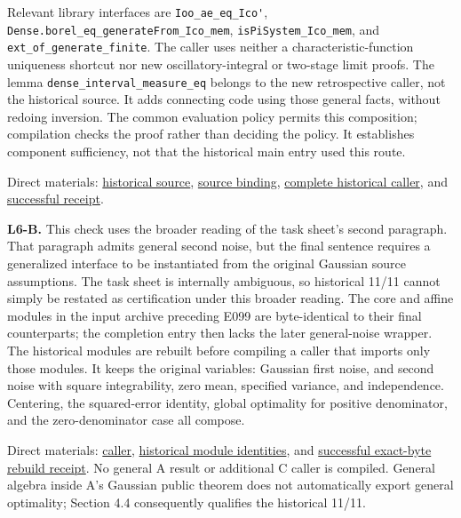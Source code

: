 Relevant library interfaces are \nolinkurl{Ioo_ae_eq_Ico'}, \nolinkurl{Dense.borel_eq_generateFrom_Ico_mem}, \nolinkurl{isPiSystem_Ico_mem}, and \nolinkurl{ext_of_generate_finite}. The caller uses neither a characteristic-function uniqueness shortcut nor new oscillatory-integral or two-stage limit proofs. The lemma \nolinkurl{dense_interval_measure_eq} belongs to the new retrospective caller, not the historical source. It adds connecting code using those general facts, without redoing inversion. The common evaluation policy permits this composition; compilation checks the proof rather than deciding the policy. It establishes component sufficiency, not that the historical main entry used this route.

Direct materials: \href{research/analysis_20260915/final_research_supplement_20260915/evidence/H1_before_E468.lean}{historical source}, \href{research/analysis_20260915/final_research_supplement_20260915/checks/H1_source_binding.json}{source binding}, \href{research/analysis_20260915/final_research_supplement_20260915/checks/H1_historical_caller.lean}{complete historical caller}, and \href{research/analysis_20260915/final_research_supplement_20260915/checks/h1_historical_caller.json}{successful receipt}.

\textbf{L6-B.} This check uses the broader reading of the task sheet's second paragraph. That paragraph admits general second noise, but the final sentence requires a generalized interface to be instantiated from the original Gaussian source assumptions. The task sheet is internally ambiguous, so historical 11/11 cannot simply be restated as certification under this broader reading. The core and affine modules in the input archive preceding E099 are byte-identical to their final counterparts; the completion entry then lacks the later general-noise wrapper. The historical modules are rebuilt before compiling a caller that imports only those modules. It keeps the original variables: Gaussian first noise, and second noise with square integrability, zero mean, specified variance, and independence. Centering, the squared-error identity, global optimality for positive denominator, and the zero-denominator case all compose.

Direct materials: \href{research/analysis_20260915/final_research_supplement_20260915/checks/L6_B_composition.lean}{caller}, \href{research/analysis_20260915/final_research_supplement_20260915/checks/L6_source_binding.json}{historical module identities}, and \href{research/analysis_20260915/final_research_supplement_20260915/checks/l6_historical_rebuild_exact_bytes.json}{successful exact-byte rebuild receipt}. No general A result or additional C caller is compiled. General algebra inside A's Gaussian public theorem does not automatically export general optimality; Section 4.4 consequently qualifies the historical 11/11.

